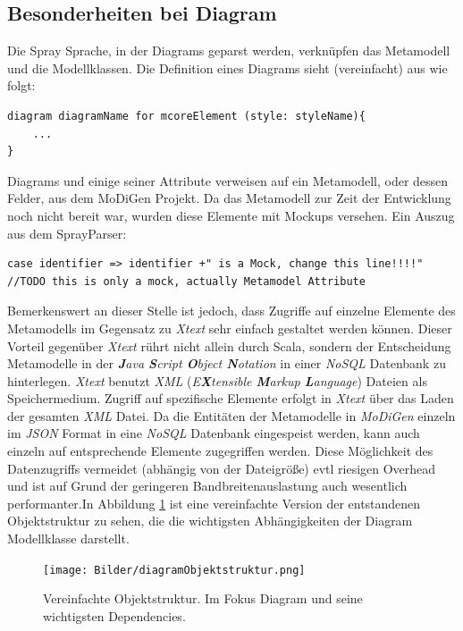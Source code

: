 \subsection{Besonderheiten bei Diagram}
Die Spray Sprache, in der Diagrams geparst werden, verknüpfen das Metamodell und die Modellklassen. Die Definition eines Diagrams sieht (vereinfacht) aus wie folgt:
\begin{lstlisting}[style=spray]
diagram diagramName for mcoreElement (style: styleName){
	...
}
\end{lstlisting}Diagrams und einige seiner Attribute verweisen auf ein Metamodell, oder dessen Felder, aus dem MoDiGen Projekt.
Da das Metamodell zur Zeit der Entwicklung noch nicht bereit war, wurden diese Elemente mit Mockups versehen.
Ein Auszug aus dem SprayParser:
\begin{lstlisting}[style=scala]
case identifier => identifier +" is a Mock, change this line!!!!"
//TODO this is only a mock, actually Metamodel Attribute
\end{lstlisting}Bemerkenswert an dieser Stelle ist jedoch, dass Zugriffe auf einzelne Elemente des Metamodells im Gegensatz zu \textit{Xtext} sehr einfach gestaltet werden können. Dieser Vorteil gegenüber \textit{Xtext} rührt nicht allein durch Scala, sondern der Entscheidung Metamodelle in der \textit{\textbf{J}ava \textbf{S}cript \textbf{O}bject \textbf{N}otation} in einer \textit{NoSQL} Datenbank zu hinterlegen. \textit{Xtext} benutzt \textit{XML} (\textit{E\textbf{X}tensible \textbf{M}arkup \textbf{L}anguage}) Dateien als Speichermedium. Zugriff auf spezifische Elemente erfolgt in \textit{Xtext} über das Laden der gesamten \textit{XML} Datei. Da die Entitäten der Metamodelle in \textit{MoDiGen} einzeln im \textit{JSON} Format in eine \textit{NoSQL} Datenbank eingespeist werden, kann auch einzeln auf entsprechende Elemente zugegriffen werden. Diese Möglichkeit des Datenzugriffs vermeidet (abhängig von der Dateigröße) evtl riesigen Overhead und ist auf Grund der geringeren Bandbreitenauslastung auch wesentlich performanter.\linebreak In Abbildung \ref{objectstructureDiagram} ist eine vereinfachte Version der entstandenen Objektstruktur zu sehen, die die wichtigsten Abhängigkeiten der Diagram Modellklasse darstellt.
\begin{figure}[H]
\begin{center}
\texttt{[image: Bilder/diagramObjektstruktur.png]}
\caption{Vereinfachte Objektstruktur. Im Fokus Diagram und seine wichtigsten Dependencies.}
\label{objectstructureDiagram}
\end{center}
\end{figure}
